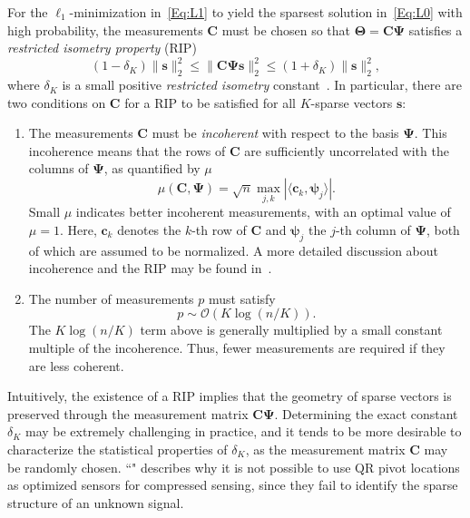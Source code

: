 \documentclass[letterpaper]{IEEEtran}
\newcommand{\bs}{\mathbf{s}}
\newcommand{\bC}{\mathbf{C}}
\newcommand{\bPsi}{\mathbf{\Psi}}
\newcommand{\bpsi}{\boldsymbol\psi}
\newcommand{\bTheta}{\mathbf{\Theta}}
\begin{document}
For the $\ell_1$-minimization in~\eqref{Eq:L1} to yield the sparsest solution in~\eqref{Eq:L0} with high probability, the measurements $\bC$ must be chosen so that ${\bTheta=\bC\bPsi}$ satisfies a \emph{restricted isometry property} (RIP)
%
\begin{equation}
(1-\delta_K)\|\bs\|_2^2 \leq \|\bC\bPsi\bs\|_2^2\leq (1+\delta_K)\|\bs\|_2^2,
\end{equation}
%
where $\delta_K$ is a small positive \emph{restricted isometry} constant~\cite{Candes:2005,Candes2008ieeespm}.  
In particular, there are two conditions on $\bC$ for a RIP to be satisfied for all $K$-sparse vectors $\bs$:
\begin{enumerate}
	\item The measurements $\bC$ must be \emph{incoherent} with respect to the basis $\bPsi$.  
	This incoherence means that the rows of $\bC$ are sufficiently uncorrelated with the columns of $\bPsi$, as quantified by $\mu$
	\begin{equation}
	\mu(\bC,\bPsi) = \sqrt{n} \max_{j,k}|\langle \mathbf{c}_k,\mathbf{\bpsi}_j\rangle|.
	\end{equation}
	Small $\mu$ indicates better incoherent measurements, with an optimal value of $\mu=1$.  
	Here, $\mathbf{c}_k$ denotes the $k$-th row of $\bC$ and $\mathbf{\bpsi}_j$ the $j$-th column of $\bPsi$, both of which are assumed to be normalized.  A more detailed discussion about incoherence and the RIP may be found in~\cite{Baraniuk2007ieeespm,Candes2008ieeespm}.  
	\item The number of measurements $p$ must satisfy~\cite{Candes2006picm,Candes2006bieeetit, Baraniuk2007ieeespm,Candes2008ieeespm,Candes:2010}
	\begin{equation}
	p\sim \mathcal{O}(K\log(n/K)).
	\end{equation}
	The $K\log(n/K)$ term above is generally multiplied by a small constant multiple of the incoherence.  
	Thus, fewer measurements are required if they are less coherent. 
\end{enumerate}

Intuitively, the existence of a RIP implies that the geometry of sparse vectors is preserved through the measurement matrix $\bC\bPsi$.  
Determining the exact constant $\delta_K$ may be extremely challenging in practice, and it tends to be more desirable to characterize the statistical properties of $\delta_K$, as the measurement matrix $\bC$ may be randomly chosen.  
``" describes why it is not possible to use QR pivot locations as optimized sensors for compressed sensing, since they fail to identify the sparse structure of an unknown signal.  
\end{document}
